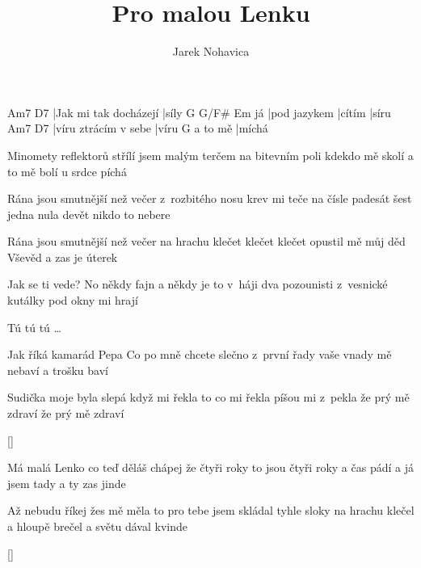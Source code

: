 \documentclass{song}
\author{Jarek Nohavica}
\title{Pro malou Lenku}
\begin{document}
\begin{multicols}{2}
\strophe
Am7                   D7
|Jak mi tak docházejí |síly
   G            G/F#   Em
já |pod jazykem |cítím |síru
Am7                  D7
|víru ztrácím v sebe |víru
        G
a to mě |míchá
\endstrophe

\columnbreak
\strophe*
Minomety reflektorů střílí
jsem malým terčem na bitevním poli
kdekdo mě skolí a to mě bolí
u srdce píchá
\endstrophe
\end{multicols}

Rána jsou smutnější než večer
z~rozbitého nosu krev mi teče
na čísle padesát šest jedna nula devět
nikdo to nebere

Rána jsou smutnější než večer
na hrachu klečet klečet klečet
opustil mě můj děd Vševěd
a zas je úterek

Jak se ti vede?
No někdy fajn a někdy je to v~háji
dva pozounisti z~vesnické kutálky
pod okny mi hrají

Tú tú tú \ldots
\endstrophe

\begin{multicols}{2}
\strophe*
Jak říká kamarád Pepa
Co po mně chcete slečno z~první řady
vaše vnady mě nebaví
a trošku baví
\endstrophe

\strophe*
Sudička moje byla slepá
když mi řekla to co mi řekla
píšou mi z~pekla že prý mě zdraví
že prý mě zdraví
\endstrophe
\end{multicols}

\ref{}

\begin{multicols}{2}
\strophe*
Má malá Lenko co teď děláš
chápej že čtyři roky to jsou čtyři roky
a čas pádí a já jsem tady
a ty zas jinde
\endstrophe

\strophe*
Až nebudu říkej žes mě měla
to pro tebe jsem skládal tyhle sloky
na hrachu klečel a hloupě brečel
a světu dával kvinde
\endstrophe
\end{multicols}

\ref{}
\end{document}
